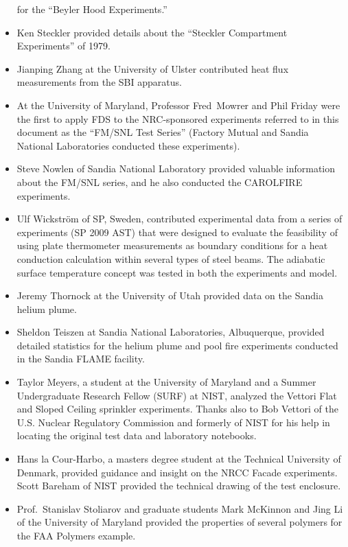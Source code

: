 \documentclass[11pt]{book}
\begin{document}
\begin{itemize}
for the ``Beyler Hood Experiments.''
\item Ken Steckler provided details about the ``Steckler Compartment Experiments'' of 1979.
\item Jianping Zhang at the University of Ulster contributed heat flux measurements from the SBI apparatus.
\item At the University of Maryland, Professor Fred~Mowrer and Phil Friday
were the first to apply FDS to the NRC-sponsored experiments referred
to in this document as the ``FM/SNL Test Series'' (Factory Mutual and
Sandia National Laboratories conducted these experiments).
\item Steve Nowlen of Sandia National Laboratory provided valuable information about the FM/SNL series, and he also conducted the CAROLFIRE experiments.
\item Ulf Wickstr\"{o}m of SP, Sweden, contributed experimental data from a series of experiments (SP 2009 AST) that were designed to
evaluate the feasibility of using plate thermometer measurements as boundary conditions for a heat conduction calculation within several types of
steel beams. The adiabatic surface temperature concept was tested in both the experiments and model.
\item Jeremy Thornock at the University of Utah provided data on the Sandia helium plume.
\item Sheldon Teiszen at Sandia National Laboratories, Albuquerque, provided detailed statistics for the helium plume and pool fire experiments conducted in the Sandia FLAME facility.
\item Taylor Meyers, a student at the University of Maryland and a Summer Undergraduate Research Fellow (SURF) at NIST, analyzed the
Vettori Flat and Sloped Ceiling sprinkler experiments. Thanks also to Bob Vettori of the U.S. Nuclear Regulatory Commission and formerly of NIST for his
help in locating the original test data and laboratory notebooks.
\item Hans la Cour-Harbo, a masters degree student at the Technical University of Denmark, provided guidance and insight on the NRCC Facade experiments. Scott Bareham of
NIST provided the technical drawing of the test enclosure.
\item Prof.~Stanislav Stoliarov and graduate students Mark McKinnon and Jing Li of the University of Maryland provided the properties of several polymers for the
FAA Polymers example.
\end{itemize}
\end{document}
